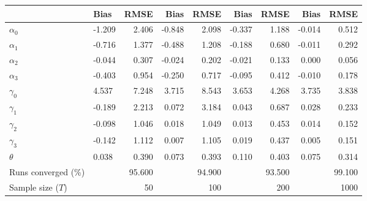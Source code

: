 
\begin{tabular}[t]{llrrrrrrr}
\toprule
  & Bias & RMSE & Bias & RMSE & Bias & RMSE & Bias & RMSE\\
\midrule
$\alpha_{0}$ & -1.209 & 2.406 & -0.848 & 2.098 & -0.337 & 1.188 & -0.014 & 0.512\\
$\alpha_{1}$ & -0.716 & 1.377 & -0.488 & 1.208 & -0.188 & 0.680 & -0.011 & 0.292\\
$\alpha_{2}$ & -0.044 & 0.307 & -0.024 & 0.202 & -0.021 & 0.133 & 0.000 & 0.056\\
$\alpha_{3}$ & -0.403 & 0.954 & -0.250 & 0.717 & -0.095 & 0.412 & -0.010 & 0.178\\
$\gamma_{0}$ & 4.537 & 7.248 & 3.715 & 8.543 & 3.653 & 4.268 & 3.735 & 3.838\\
$\gamma_{1}$ & -0.189 & 2.213 & 0.072 & 3.184 & 0.043 & 0.687 & 0.028 & 0.233\\
$\gamma_{2}$ & -0.098 & 1.046 & 0.018 & 1.049 & 0.013 & 0.453 & 0.014 & 0.152\\
$\gamma_{3}$ & -0.142 & 1.112 & 0.007 & 1.105 & 0.019 & 0.437 & 0.005 & 0.151\\
$\theta$ & 0.038 & 0.390 & 0.073 & 0.393 & 0.110 & 0.403 & 0.075 & 0.314\\
Runs converged (\%) &  & 95.600 &  & 94.900 &  & 93.500 &  & 99.100\\
Sample size ($T$) &  & 50 &  & 100 &  & 200 &  & 1000\\
\bottomrule
\end{tabular}
